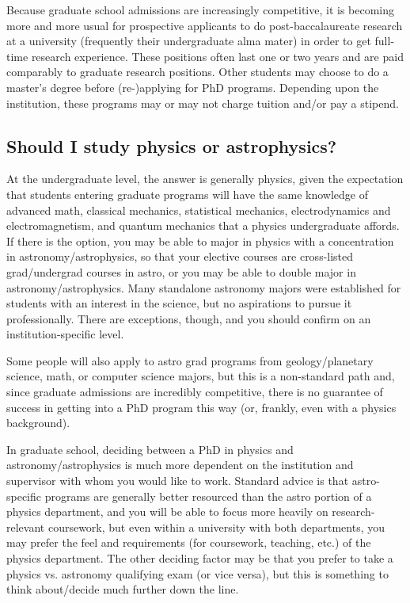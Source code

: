 Because graduate school admissions are increasingly competitive, it is becoming more and more usual for prospective applicants to do post-baccalaureate research at a university (frequently their undergraduate alma mater) in order to get full-time research experience. These positions often last one or two years and are paid comparably to graduate research positions. Other students may choose to do a master's degree before (re-)applying for PhD programs. Depending upon the institution, these programs may or may not charge tuition and/or pay a stipend.

\subsection{Should I study physics or astrophysics?}

At the undergraduate level, the answer is generally physics, given the expectation that students entering graduate programs will have the same knowledge of advanced math, classical mechanics, statistical mechanics, electrodynamics and electromagnetism, and quantum mechanics that a physics undergraduate affords. If there is the option, you may be able to major in physics with a concentration in astronomy/astrophysics, so that your elective courses are cross-listed grad/undergrad courses in astro, or you may be able to double major in astronomy/astrophysics. Many standalone astronomy majors were established for students with an interest in the science, but no aspirations to pursue it professionally. There are exceptions, though, and you should confirm on an institution-specific level. 

Some people will also apply to astro grad programs from geology/planetary science, math, or computer science majors, but this is a non-standard path and, since graduate admissions are incredibly competitive, there is no guarantee of success in getting into a PhD program this way (or, frankly, even with a physics background).

In graduate school, deciding between a PhD in physics and astronomy/astrophysics is much more dependent on the institution and supervisor with whom you would like to work. Standard advice is that astro-specific programs are generally better resourced than the astro portion of a physics department, and you will be able to focus more heavily on research-relevant coursework, but even within a university with both departments, you may prefer the feel and requirements (for coursework, teaching, etc.) of the physics department. The other deciding factor may be that you prefer to take a physics vs. astronomy qualifying exam (or vice versa), but this is something to think about/decide much further down the line.

